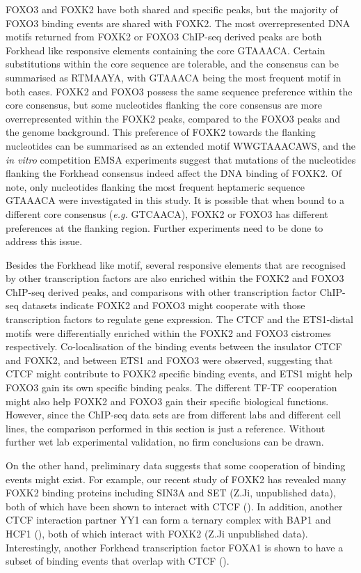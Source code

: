 FOXO3 and FOXK2 have both shared and specific peaks, but the majority of FOXO3 binding events are shared with FOXK2. The most overrepresented DNA motifs returned from FOXK2 or FOXO3 ChIP-seq derived peaks are both Forkhead like responsive elements containing the core GTAAACA. Certain substitutions within the core sequence are tolerable, and the consensus can be summarised as RTMAAYA, with GTAAACA being the most frequent motif in both cases. FOXK2 and FOXO3 possess the same sequence preference within the core consensus, but some nucleotides flanking the core consensus are more overrepresented within the FOXK2 peaks, compared to the FOXO3 peaks and the genome background. This preference of FOXK2 towards the flanking nucleotides can be summarised as an extended motif WWGTAAACAWS, and the \textit{in vitro} competition EMSA experiments suggest that mutations of the nucleotides flanking the Forkhead consensus indeed affect the DNA binding of FOXK2. Of note, only nucleotides flanking the most frequent heptameric sequence GTAAACA were investigated in this study. It is possible that when bound to a different core consensus (\textit{e.g.} GTCAACA), FOXK2 or FOXO3 has different preferences at the flanking region. Further experiments need to be done to address this issue.

Besides the Forkhead like motif, several responsive elements that are recognised by other transcription factors are also enriched within the FOXK2 and FOXO3 ChIP-seq derived peaks, and comparisons with other transcription factor ChIP-seq datasets indicate FOXK2 and FOXO3 might cooperate with those transcription factors to regulate gene expression. The CTCF and the ETS1-distal motifs were differentially enriched within the FOXK2 and FOXO3 cistromes respectively. Co-localisation of the binding events between the insulator CTCF and FOXK2, and between ETS1 and FOXO3 were observed, suggesting that CTCF might contribute to FOXK2 specific binding events, and ETS1 might help FOXO3 gain its own specific binding peaks. The different TF-TF cooperation might also help FOXK2 and FOXO3 gain their specific biological functions. However, since the ChIP-seq data sets are from different labs and different cell lines, the comparison performed in this section is just a reference. Without further wet lab experimental validation, no firm conclusions can be drawn.

On the other hand, preliminary data suggests that some cooperation of binding events might exist. For example, our recent study of FOXK2 has revealed many FOXK2 binding proteins including SIN3A and SET (Z.Ji, unpublished data), both of which have been shown to interact with CTCF (\cite{lutz2000transcriptional,yusufzai2004ctcf}). In addition, another CTCF interaction partner YY1 can form a ternary complex with BAP1 and HCF1 (\cite{yu2010the}), both of which interact with FOXK2 (Z.Ji unpublished data). Interestingly, another Forkhead transcription factor FOXA1 is shown to have a subset of binding events that overlap with CTCF (\cite{ross-innes2011a}).

